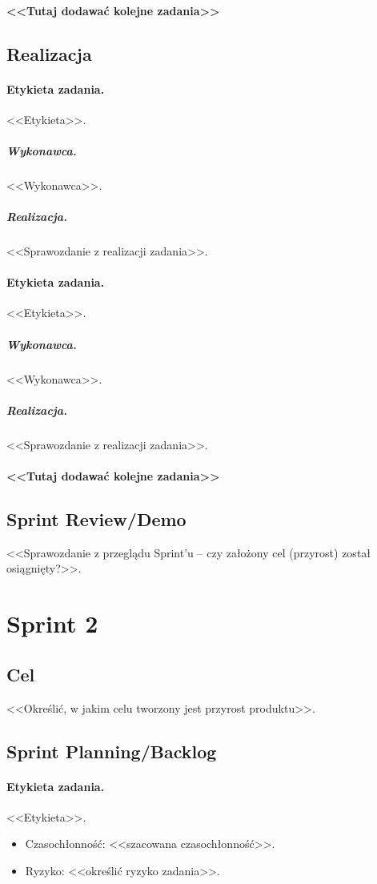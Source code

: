 \documentclass[a4paper]{amsart}
\begin{document}
\paragraph{<<Tutaj dodawać kolejne zadania>>}

\subsection{Realizacja}

\paragraph{Etykieta zadania.} <<Etykieta>>.
\subparagraph{Wykonawca.} <<Wykonawca>>.
\subparagraph{Realizacja.} <<Sprawozdanie z realizacji zadania>>.

\paragraph{Etykieta zadania.} <<Etykieta>>.
\subparagraph{Wykonawca.} <<Wykonawca>>.
\subparagraph{Realizacja.} <<Sprawozdanie z realizacji zadania>>.

\paragraph{<<Tutaj dodawać kolejne zadania>>}


\subsection{Sprint Review/Demo}
<<Sprawozdanie z przeglądu Sprint'u -- czy założony cel (przyrost) został osiągnięty?>>.

\section{Sprint 2}

\subsection{Cel} <<Określić, w jakim celu tworzony jest przyrost produktu>>.

\subsection{Sprint Planning/Backlog}

\paragraph{Etykieta zadania.} <<Etykieta>>.
\begin{itemize}
\item Czasochłonność: <<szacowana czasochłonność>>.
\item{Ryzyko:} <<określić ryzyko zadania>>.
\end{itemize}
\end{document}
